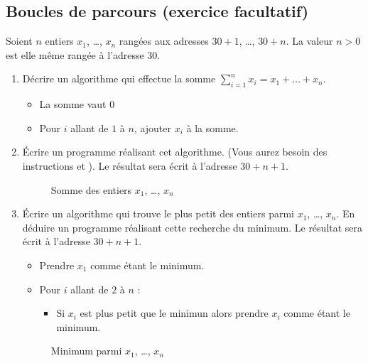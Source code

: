 \subsection{Boucles de parcours (exercice facultatif)}

Soient $n$ entiers $x_1$, \ldots, $x_n$ rangées aux adresses $30 + 1$,
\ldots, $30 + n$. La valeur $n > 0$ est elle même rangée à l'adresse
$30$.

\begin{enumerate}
\item Décrire un algorithme qui effectue la somme $\sum^{n}_{i = 1} x_i
  = x_1 + \ldots + x_n$. 
\begin{correction}
\begin{itemize}
\item La somme vaut $0$
\item Pour $i$ allant de $1$ à $n$, ajouter $x_i$ à la somme.
\end{itemize}
\end{correction}
\item Écrire un programme réalisant cet algorithme. (Vous aurez besoin
  des instructions  et ). Le
  résultat sera écrit à l'adresse $30 + n + 1$.

\begin{correction}
    \begin{figure}[tbp]
      \centering\small
      
      \caption{Somme des entiers $x_1$, \ldots, $x_n$}
      \label{fig:bouclesomme}
    \end{figure}    
\end{correction}
\item Écrire un algorithme qui trouve le plus petit des entiers parmi
  $x_1$, \ldots, $x_n$.  En déduire un programme réalisant cette
  recherche du minimum. Le résultat sera écrit à l'adresse $30 + n +
  1$.
\begin{correction}
\begin{itemize}
\item Prendre $x_1$ comme étant le minimum.
\item Pour $i$ allant de $2$ à $n$ :
  \begin{itemize}
  \item Si $x_i$ est plus petit que le minimun alors
    prendre $x_i$ comme étant le minimum.
  \end{itemize}
\end{itemize}

    \begin{figure}[tbp]
      \centering\footnotesize
      
      \caption{Minimum parmi $x_1$, \ldots, $x_n$}
      \label{fig:boucleminimum}
    \end{figure}    
\end{correction}
\end{enumerate}



